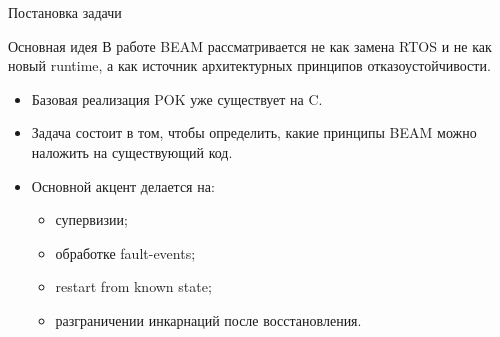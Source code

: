	\begin{frame}{Постановка задачи}
	\begin{block}{Основная идея}
		В работе BEAM рассматривается не как замена RTOS и не как новый runtime, а как источник архитектурных принципов отказоустойчивости.
	\end{block}
	
	\vspace{0.3cm}
	
	\begin{itemize}
		\item Базовая реализация POK уже существует на C.
		\item Задача состоит в том, чтобы определить, какие принципы BEAM можно наложить на существующий код.
		\item Основной акцент делается на:
		\begin{itemize}
			\item супервизии;
			\item обработке fault-events;
			\item restart from known state;
			\item разграничении инкарнаций после восстановления.
		\end{itemize}
	\end{itemize}
\end{frame}